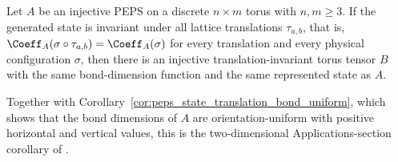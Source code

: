 \begin{lemma}%
    \label{thm:exists_constant_injectivePEPS_of_translationInvariantState}
    \leanok
    Let $A$ be an injective PEPS on a discrete $n\times m$ torus with
    $n,m\ge3$. If the generated state is invariant
    under all lattice translations $\tau_{a,b}$, that is,
    $\Coeff_A(\sigma\circ\tau_{a,b})=\Coeff_A(\sigma)$ for every translation
    and every physical configuration $\sigma$, then there is an injective
    translation-invariant torus tensor $B$ with the same bond-dimension
    function and the same represented state as $A$.
\end{lemma}
Together with
Corollary~\ref{cor:peps_state_translation_bond_uniform}, which shows that
the bond dimensions of $A$ are orientation-uniform with positive horizontal
and vertical values, this is the two-dimensional Applications-section
corollary of \cite[lines~1891--1894]{Molnar2018NormalPEPS}.
